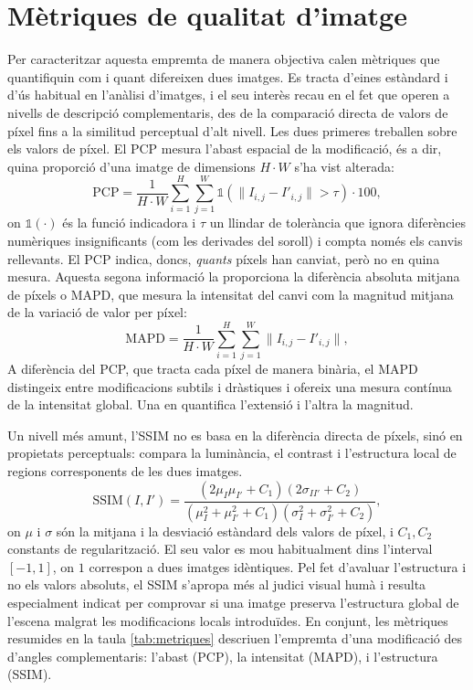 \section{Mètriques de qualitat d'imatge}
Per caracteritzar aquesta empremta de manera objectiva calen mètriques que quantifiquin com i quant difereixen dues imatges. Es tracta d'eines estàndard i d'ús habitual en l'anàlisi d'imatges, i el seu interès recau en el fet que operen a nivells de descripció complementaris, des de la comparació directa de valors de píxel fins a la similitud perceptual d'alt nivell. Les dues primeres treballen sobre els valors de píxel. El \ac{PCP} mesura l'abast espacial de la modificació, és a dir, quina proporció d'una imatge de dimensions $H \cdot W$ s'ha vist alterada:
\begin{equation}
\text{PCP} = \frac{1}{H \cdot W} \sum_{i=1}^{H}\sum_{j=1}^{W} \mathbb{1}\left( \lVert I_{i,j} - I'_{i,j} \rVert > \tau \right) \cdot 100,
\end{equation}
on $\mathbb{1}(\cdot)$ és la funció indicadora i $\tau$ un llindar de tolerància que ignora diferències numèriques insignificants (com les derivades del soroll) i compta només els canvis rellevants. El \ac{PCP} indica, doncs, \emph{quants} píxels han canviat, però no en quina mesura. Aquesta segona informació la proporciona la diferència absoluta mitjana de píxels o \ac{MAPD}, que mesura la intensitat del canvi com la magnitud mitjana de la variació de valor per píxel:
\begin{equation}
\text{MAPD} = \frac{1}{H \cdot W} \sum_{i=1}^{H}\sum_{j=1}^{W} \lVert I_{i,j} - I'_{i,j} \rVert,
\end{equation}
A diferència del \ac{PCP}, que tracta cada píxel de manera binària, el \ac{MAPD} distingeix entre modificacions subtils i dràstiques i ofereix una mesura contínua de la intensitat global. Una en quantifica l'extensió i l'altra la magnitud.

Un nivell més amunt, l'\ac{SSIM} no es basa en la diferència directa de píxels, sinó en propietats perceptuals: compara la luminància, el contrast i l'estructura local de regions corresponents de les dues imatges.
\begin{equation}
\text{SSIM}(I, I') = \frac{(2\mu_I \mu_{I'} + C_1)(2\sigma_{II'} + C_2)}{(\mu_I^2 + \mu_{I'}^2 + C_1)(\sigma_I^2 + \sigma_{I'}^2 + C_2)},
\end{equation}
on $\mu$ i $\sigma$ són la mitjana i la desviació estàndard dels valors de píxel, i $C_1, C_2$ constants de regularització. El seu valor es mou habitualment dins l'interval $[-1, 1]$, on $1$ correspon a dues imatges idèntiques. Pel fet d'avaluar l'estructura i no els valors absoluts, el \ac{SSIM} s'apropa més al judici visual humà i resulta especialment indicat per comprovar si una imatge preserva l'estructura global de l'escena malgrat les modificacions locals introduïdes. En conjunt, les mètriques resumides en la taula \ref{tab:metriques} descriuen l'empremta d'una modificació des d'angles complementaris: l'abast (\ac{PCP}), la intensitat (\ac{MAPD}), i l'estructura (\ac{SSIM}).

